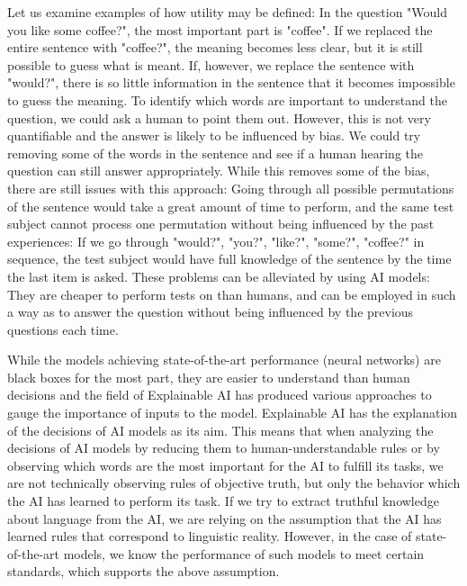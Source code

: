 Let us examine examples of how utility may be defined:
In the question "Would you like some coffee?", the most important part is "coffee".
If we replaced the entire sentence with "coffee?", the meaning becomes less clear, but it is still possible to guess what is meant.
If, however, we replace the sentence with "would?", there is so little information in the sentence that it becomes impossible to guess the meaning.
To identify which words are important to understand the question, we could ask a human to point them out.
However, this is not very quantifiable and the answer is likely to be influenced by bias.
We could try removing some of the words in the sentence and see if a human hearing the question can still answer appropriately.
While this removes some of the bias, there are still issues with this approach:
Going through all possible permutations of the sentence would take a great amount of time to perform, and the same test subject cannot process one permutation without being influenced by the past experiences:
If we go through "would?", "you?", "like?", "some?", "coffee?" in sequence, the test subject would have full knowledge of the sentence by the time the last item is asked.
These problems can be alleviated by using AI models: They are cheaper to perform tests on than humans, and can be employed in such a way as to answer the question without being influenced by the previous questions each time.



While the models achieving state-of-the-art performance (neural networks) are black boxes for the most part, they are easier to understand than human decisions and the field of Explainable AI has produced various approaches to gauge the importance of inputs to the model.
Explainable AI has the explanation of the decisions of AI models as its aim.
This means that when analyzing the decisions of AI models by reducing them to human-understandable rules or by observing which words are the most important for the AI to fulfill its tasks, we are not technically observing rules of objective truth, but only the behavior which the AI has learned to perform its task.
If we try to extract truthful knowledge about language from the AI, we are relying on the assumption that the AI has learned rules that correspond to linguistic reality.
However, in the case of state-of-the-art models, we know the performance of such models to meet certain standards, which supports the above assumption.


